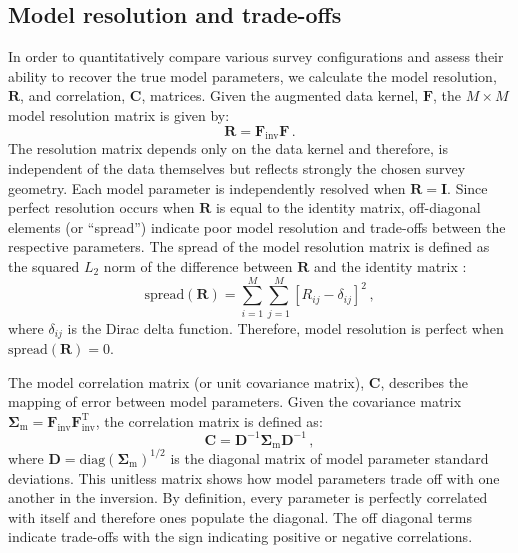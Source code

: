 \subsection{Model resolution and trade-offs}
In order to quantitatively compare various survey configurations and assess their ability to recover the true model parameters, we calculate the model resolution, $\mathbf{R}$, and correlation, $\mathbf{C}$, matrices. Given the augmented data kernel, $\mathbf{F}$, the $M \times M$ model resolution matrix is given by:
\begin{equation}
\mathbf{R} = \mathbf{F}_{\text{inv}} \mathbf{F} \,.
\end{equation}
The resolution matrix depends only on the data kernel and therefore, is independent of the data themselves but reflects strongly the chosen survey geometry. Each model parameter is independently resolved when $\mathbf{R}=\mathbf{I}$. Since perfect resolution occurs when $\mathbf{R}$ is equal to the identity matrix, off-diagonal elements (or ``spread'') indicate poor model resolution and trade-offs between the respective parameters. The spread of the model resolution matrix is defined as the squared $L_2$ norm of the difference between $\mathbf{R}$ and the identity matrix \citep{William:2012vh}:
\begin{equation}
\text{spread}(\mathbf{R}) = \sum_{i=1}^M\sum_{j=1}^M \left[ R_{ij}-\delta_{ij}\right]^2 \,,
\end{equation}
where $\delta_{ij}$ is the Dirac delta function. Therefore, model resolution is perfect when $\text{spread}(\mathbf{R})=0$.

The model correlation matrix (or unit covariance matrix), $\mathbf{C}$, describes the mapping of error between model parameters. Given the covariance matrix $\mathbf{\Sigma}_{\text{m}} = \mathbf{F}_{\text{inv}} \mathbf{F}_{\text{inv}}^{\text{T}}$, the correlation matrix is defined as:
\begin{equation}
\mathbf{C} = \mathbf{D}^{-1}\mathbf{\Sigma}_{\text{m}}\mathbf{D}^{-1} \,,
\end{equation}
where $\mathbf{D} = \text{diag}(\mathbf{\Sigma}_{\text{m}})^{1/2}$ is the diagonal matrix of model parameter standard deviations. This unitless matrix shows how model parameters trade off with one another in the inversion. By definition, every parameter is perfectly correlated with itself and therefore ones populate the diagonal. The off diagonal terms indicate trade-offs with the sign indicating positive or negative correlations.







